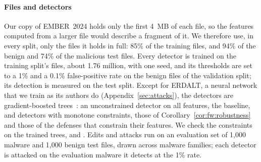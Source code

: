 \paragraph{Files and detectors}
Our copy of EMBER~2024 holds only the first 4~MB of each file, so the features computed from a larger file would
describe a fragment of it. We therefore use, in every split, only the files it holds in full: 85\% of the training
files, and 94\% of the benign and 74\% of the malicious test files. Every detector is trained on the training split's
files, about 1.76 million, with one seed, and its thresholds are set to a 1\% and a 0.1\% false-positive rate on the
benign files of the validation split; its detection is measured on the test split. Except for ERDALT, a neural network
that we train as its authors do (Appendix~\ref{sec:attacks}), the detectors are gradient-boosted
trees~\cite{ke2017lightgbm}: an unconstrained detector on all features, the baseline, and detectors with monotone
constraints, those of Corollary~\ref{cor:fw:robustness} and those of the defenses that constrain their features.
We check the constraints on the trained trees, and . Edits and attacks run on an evaluation set of 1,000
malware and 1,000 benign test files, drawn across malware families; each detector is attacked on the evaluation
malware it detects at the 1\% rate.

